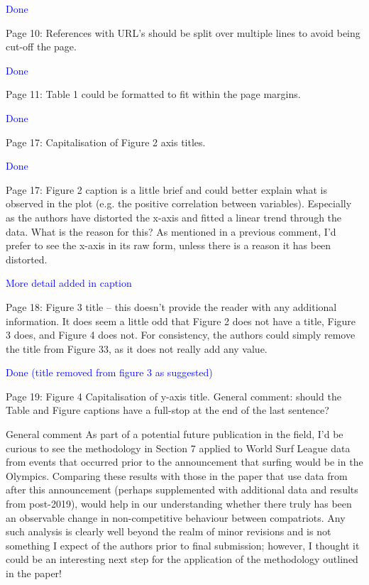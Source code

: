 \documentclass[12pt]{article}
\begin{document}
\textcolor{blue}{Done}

Page 10: References with URL's should be split over multiple lines to avoid being cut-off the page.

\textcolor{blue}{Done}

Page 11: Table 1 could be formatted to fit within the page margins.

\textcolor{blue}{Done}

Page 17: Capitalisation of Figure 2 axis titles.

\textcolor{blue}{Done}

Page 17: Figure 2 caption is a little brief and could better explain
what is observed in the plot (e.g. the positive correlation between
variables). Especially as the authors have distorted the x-axis and
fitted a linear trend through the data. What is the reason for this?
As mentioned in a previous comment, I’d prefer to see the x-axis in
its raw form, unless there is a reason it has been distorted.

\textcolor{blue}{More detail added in caption}



Page 18: Figure 3 title – this doesn’t provide the reader with any
additional information. It does seem a little odd that Figure 2 does
not have a title, Figure 3 does, and Figure 4 does not. For
consistency, the authors could simply remove the title from Figure 33,
as it does not really add any value.

\textcolor{blue}{Done (title removed from figure 3 as suggested)}

Page 19: Figure 4 Capitalisation of y-axis title.  General comment:
should the Table and Figure captions have a full-stop at the end of
the last sentence?

General comment
As part of a potential future publication in the field, I’d be curious to see the methodology in Section
7 applied to World Surf League data from events that occurred prior to the announcement that surfing
would be in the Olympics. Comparing these results with those in the paper that use data from after
this announcement (perhaps supplemented with additional data and results from post-2019), would
help in our understanding whether there truly has been an observable change in non-competitive
behaviour between compatriots. Any such analysis is clearly well beyond the realm of minor revisions
and is not something I expect of the authors prior to final submission; however, I thought it could be
an interesting next step for the application of the methodology outlined in the paper!
\end{document}
